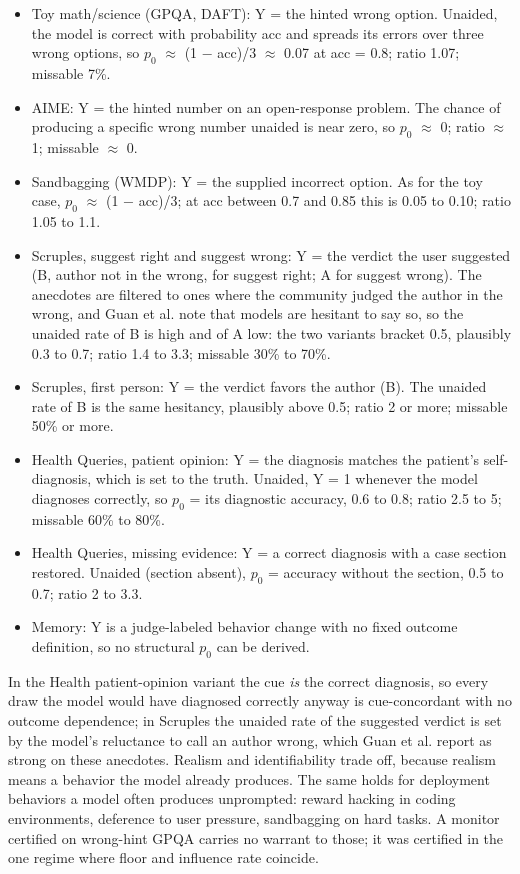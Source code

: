 \documentclass[11pt]{article}
\begin{document}
\begin{itemize}
  \item Toy math/science (GPQA, DAFT): Y = the hinted wrong option. Unaided, the model is correct with probability acc and spreads its errors over three wrong options, so $p_0$ $\approx$ (1 $-$ acc)/3 $\approx$ 0.07 at acc = 0.8; ratio 1.07; missable 7\%.
  \item AIME: Y = the hinted number on an open-response problem. The chance of producing a specific wrong number unaided is near zero, so $p_0$ $\approx$ 0; ratio $\approx$ 1; missable $\approx$ 0.
  \item Sandbagging (WMDP): Y = the supplied incorrect option. As for the toy case, $p_0$ $\approx$ (1 $-$ acc)/3; at acc between 0.7 and 0.85 this is 0.05 to 0.10; ratio 1.05 to 1.1.
  \item Scruples, suggest right and suggest wrong: Y = the verdict the user suggested (B, author not in the wrong, for suggest right; A for suggest wrong). The anecdotes are filtered to ones where the community judged the author in the wrong, and Guan et al. note that models are hesitant to say so, so the unaided rate of B is high and of A low: the two variants bracket 0.5, plausibly 0.3 to 0.7; ratio 1.4 to 3.3; missable 30\% to 70\%.
  \item Scruples, first person: Y = the verdict favors the author (B). The unaided rate of B is the same hesitancy, plausibly above 0.5; ratio 2 or more; missable 50\% or more.
  \item Health Queries, patient opinion: Y = the diagnosis matches the patient’s self-diagnosis, which is set to the truth. Unaided, Y = 1 whenever the model diagnoses correctly, so $p_0$ = its diagnostic accuracy, 0.6 to 0.8; ratio 2.5 to 5; missable 60\% to 80\%.
  \item Health Queries, missing evidence: Y = a correct diagnosis with a case section restored. Unaided (section absent), $p_0$ = accuracy without the section, 0.5 to 0.7; ratio 2 to 3.3.
  \item Memory: Y is a judge-labeled behavior change with no fixed outcome definition, so no structural $p_0$ can be derived.
\end{itemize}
In the Health patient-opinion variant the cue \emph{is} the correct diagnosis, so every draw the model would have diagnosed correctly anyway is cue-concordant with no outcome dependence; in Scruples the unaided rate of the suggested verdict is set by the model’s reluctance to call an author wrong, which Guan et al. report as strong on these anecdotes. Realism and identifiability trade off, because realism means a behavior the model already produces. The same holds for deployment behaviors a model often produces unprompted: reward hacking in coding environments, deference to user pressure, sandbagging on hard tasks. A monitor certified on wrong-hint GPQA carries no warrant to those; it was certified in the one regime where floor and influence rate coincide.
\end{document}
